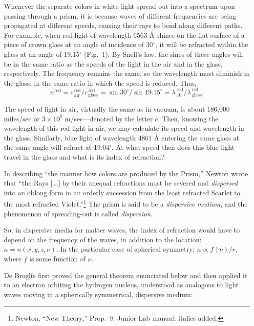 Whenever the separate colors in white light spread out into a spectrum
upon passing through a prism, it is because waves of different
frequencies are being propagated at different speeds, causing their rays
to bend along different paths. For example, when red light of wavelength
6563 Å shines on the flat surface of a piece of crown glass at an angle
of incidence of 30$^{\circ}$, it will be refracted within the glass at an angle
of 19.15$^{\circ}$ (Fig.\ 1). By Snell's law, the sines of these angles will be in
the same ratio as the speeds of the light in the air and in the glass,
respectively. The frequency remains the same, so the wavelength must
diminish in the glass, in the same ratio in which the speed is reduced.
Thus,
\begin{equation*}
n^{\textrm{red}} = c^{\,\textrm{red}}_{\,\textrm{air}}/c^{\,\textrm{red}}_{\,\textrm{glass}}=\sin 30^{\circ}/\sin 19.15^{\circ}
= \lambda^{\,\textrm{red}}_{\,\textrm{air}}/\lambda^{\,\textrm{red}}_{\,\textrm{glass}}.
\end{equation*}

The speed of light in air, virtually the same as in vacuum, is about
186,000 miles/sec or $3\!\times\!10^{8}$ m/sec---denoted by the letter $c$.
Then, knowing the wavelength of this red light in air, we may calculate
its speed and wavelength in the glass. Similarly, blue light of
wavelength 4861 Å entering the same glass at the same angle will refract
at 19.04$^{\circ}$. At what speed then does this blue light travel in the glass
and what is its index of refraction?

In describing ``the manner how colors are produced by the Prism,''
Newton wrote that ``the Rays [\,\ldots] by their unequal refractions must be
severed and \emph{dispersed} into an oblong form in an orderly
succession from the least refracted Scarlet to the most refracted
Violet.''\footnote{Newton, ``New Theory,'' Prop.\ 9, Junior Lab manual; italics added.} The prism is said to
be a \emph{dispersive medium}, and the phenomenon of spreading-out is
called \emph{dispersion}.

So, in dispersive media for matter waves, the index of refraction would
have to depend on the frequency of the waves, in addition to the
location: $n = n(x,y,z,\nu)$. In the particular case of
spherical symmetry: $n \propto f(\nu)/r$, where
$f$ is some function of $\nu$.

De Broglie first proved the general theorem enunciated below and then
applied it to an electron orbiting the hydrogen nucleus, understood as
analogous to light waves moving in a spherically symmetrical, dispersive
medium:


